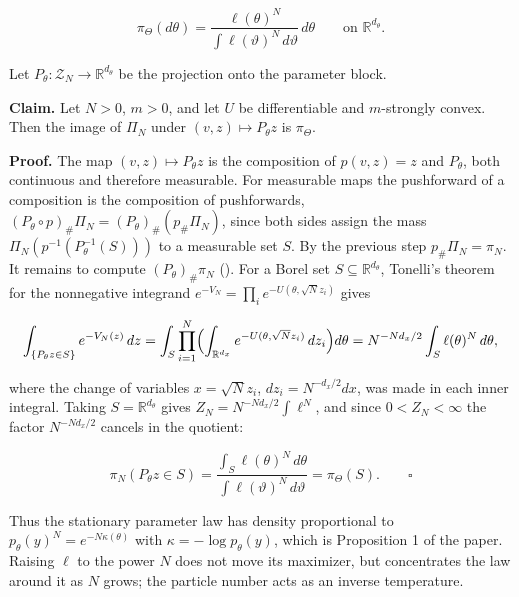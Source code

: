 \documentclass[11pt,a4paper]{article}
\begin{document}
\[\pi_\Theta(d\theta)=\frac{\ell(\theta)^N}{\int\ell(\vartheta)^N\,d\vartheta}\,d\theta\qquad\text{on }\mathbb R^{d_\theta}.\]


Let \(P_\theta:\mathcal Z_N\to\mathbb R^{d_\theta}\) be the projection onto the parameter block.




\textbf{Claim.} Let \(N>0\), \(m>0\), and let \(U\) be differentiable and \(m\)-strongly convex. Then the image of \(\Pi_N\) under \((v,z)\mapsto P_\theta z\) is \(\pi_\Theta\).




\textbf{Proof.} The map \((v,z)\mapsto P_\theta z\) is the composition of \(p(v,z)=z\) and \(P_\theta\), both continuous and therefore measurable. For measurable maps the pushforward of a composition is the composition of pushforwards, \((P_\theta\circ p)_\#\Pi_N=(P_\theta)_\#(p_\#\Pi_N)\), since both sides assign the mass \(\Pi_N(p^{-1}(P_\theta^{-1}(S)))\) to a measurable set \(S\). By the previous step \(p_\#\Pi_N=\pi_N\). It remains to compute \((P_\theta)_\#\pi_N\) (\cite[Section~3.9.9]{LangevinLean2026IPLA}). For a Borel set \(S\subseteq\mathbb R^{d_\theta}\), Tonelli's theorem for the nonnegative integrand \(e^{-V_N}=\prod_ie^{-U(\theta,\sqrt Nz_i)}\) gives


\[\int_{\{P_\theta z\in S\}}e^{-V_N(z)}\,dz=\int_S\prod_{i=1}^N\Bigl(\int_{\mathbb R^{d_x}}e^{-U(\theta,\sqrt Nz_i)}\,dz_i\Bigr)d\theta=N^{-Nd_x/2}\int_S\ell(\theta)^N\,d\theta,\]


where the change of variables \(x=\sqrt Nz_i\), \(dz_i=N^{-d_x/2}dx\), was made in each inner integral. Taking \(S=\mathbb R^{d_\theta}\) gives \(Z_N=N^{-Nd_x/2}\int\ell^N\), and since \(0<Z_N<\infty\) the factor \(N^{-Nd_x/2}\) cancels in the quotient:


\[\pi_N(P_\theta z\in S)=\frac{\int_S\ell(\theta)^N\,d\theta}{\int\ell(\vartheta)^N\,d\vartheta}=\pi_\Theta(S).\qquad\square\]


Thus the stationary parameter law has density proportional to \(p_\theta(y)^N=e^{-N\kappa(\theta)}\) with \(\kappa=-\log p_\theta(y)\), which is Proposition 1 of the paper. Raising \(\ell\) to the power \(N\) does not move its maximizer, but concentrates the law around it as \(N\) grows; the particle number acts as an inverse temperature.
\end{document}
